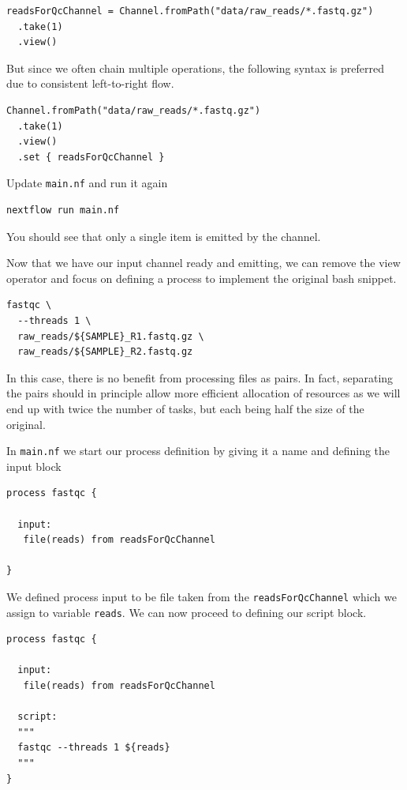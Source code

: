 \begin{lstlisting}
readsForQcChannel = Channel.fromPath("data/raw_reads/*.fastq.gz")
  .take(1)
  .view() 
\end{lstlisting}

But since we often chain multiple operations,
the following syntax is preferred due 
to consistent left-to-right flow.

\begin{lstlisting}
Channel.fromPath("data/raw_reads/*.fastq.gz")
  .take(1) 
  .view()
  .set { readsForQcChannel }
\end{lstlisting}


\begin{steps}
Update \texttt{main.nf} and run it again
\begin{lstlisting}
nextflow run main.nf
\end{lstlisting}
\end{steps}

You should see that only a single item is emitted by the channel.

Now that we have our input channel ready and emitting, we can remove the view operator
and focus on defining a process to implement the original bash snippet.

\begin{lstlisting}
fastqc \
  --threads 1 \
  raw_reads/${SAMPLE}_R1.fastq.gz \
  raw_reads/${SAMPLE}_R2.fastq.gz
\end{lstlisting}

In this case, there is no benefit from processing files as pairs.
In fact, separating the pairs should in principle allow more efficient 
allocation of resources as we will end up with twice the number of tasks,
but each being half the size of the original.


In \texttt{main.nf} we start our process definition by giving it a name 
and defining the input block 
\begin{lstlisting}
process fastqc {
    
  input:
   file(reads) from readsForQcChannel

}
\end{lstlisting}

We defined process input to be file taken from the \texttt{readsForQcChannel} which we assign to variable \texttt{reads}. We can now proceed to defining our script block.


\begin{lstlisting}
process fastqc {
    
  input:
   file(reads) from readsForQcChannel

  script:
  """
  fastqc --threads 1 ${reads}
  """
}
\end{lstlisting}

